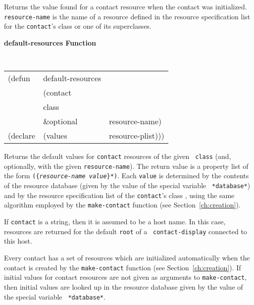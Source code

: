 \begin{flushright} \parbox[t]{6.125in}{
Returns the value found for a contact resource when the contact was initialized.
{\tt resource-name} is the name of a resource defined in the resource
specification list for the {\tt contact}'s class or one of its superclasses.

}\end{flushright}

{\samepage
{\large {\bf default-resources \hfill Function}} 
\begin{flushright} \parbox[t]{6.125in}{
\tt
\begin{tabular}{lll}
\raggedright
(defun & default-resources & \\ 
& (contact\\
& class \\
& \&optional & resource-name) \\
(declare &(values  & resource-plist)))
\end{tabular}
\rm

}\end{flushright}}

\begin{flushright} \parbox[t]{6.125in}{
Returns the default values for {\tt contact} resources  of the given {\tt
class} (and, optionally, with the given {\tt resource-name}). The return value is a
property list of the form {\tt (\{{\em resource-name value}\}*)}. Each {\tt value}
is determined by the contents of the resource database (given by the value of the special variable {\tt
*database*}) and by the resource specification list of the {\tt contact}'s class
, using  the same algorithm employed by the {\tt make-contact}
function
(see Section~\ref{ch:creation}).

If {\tt contact} is a string, then it is assumed to be a host name.  In this
case, resources are returned for the default {\tt root} of a {\tt
contact-display} connected to this host.

}\end{flushright}



Every contact has a set of resources which are initialized automatically
when the contact is created by the {\tt make-contact} function (see
Section~\ref{ch:creation}).
If initial values for contact resources are not given as arguments to
{\tt make-contact}, then initial values are looked up in the resource
database given by the value of the special variable {\tt
*database*}.


